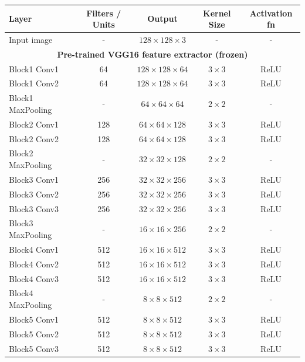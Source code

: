 \documentclass[11pt,a4paper]{article}
\begin{document}
\begin{table}[h!]
\centering
\renewcommand{\arraystretch}{1.15}
\begin{tabular}{||l|c|c|c|c||}
 \hline
 Layer & Filters / Units & Output & Kernel Size & Activation fn \\ [0.5ex]
 \hline\hline
 Input image        & -    & $128 \times 128 \times 3$   & -          & -      \\
 \hline\hline
 \multicolumn{5}{||c||}{\textbf{Pre-trained VGG16 feature extractor (frozen)}} \\
 \hline
 Block1 Conv1       & 64   & $128 \times 128 \times 64$  & $3 \times 3$ & ReLU  \\
 Block1 Conv2       & 64   & $128 \times 128 \times 64$  & $3 \times 3$ & ReLU  \\
 Block1 MaxPooling  & -    & $64 \times 64 \times 64$    & $2 \times 2$ & -     \\
 \hline
 Block2 Conv1       & 128  & $64 \times 64 \times 128$   & $3 \times 3$ & ReLU  \\
 Block2 Conv2       & 128  & $64 \times 64 \times 128$   & $3 \times 3$ & ReLU  \\
 Block2 MaxPooling  & -    & $32 \times 32 \times 128$   & $2 \times 2$ & -     \\
 \hline
 Block3 Conv1       & 256  & $32 \times 32 \times 256$   & $3 \times 3$ & ReLU  \\
 Block3 Conv2       & 256  & $32 \times 32 \times 256$   & $3 \times 3$ & ReLU  \\
 Block3 Conv3       & 256  & $32 \times 32 \times 256$   & $3 \times 3$ & ReLU  \\
 Block3 MaxPooling  & -    & $16 \times 16 \times 256$   & $2 \times 2$ & -     \\
 \hline
 Block4 Conv1       & 512  & $16 \times 16 \times 512$   & $3 \times 3$ & ReLU  \\
 Block4 Conv2       & 512  & $16 \times 16 \times 512$   & $3 \times 3$ & ReLU  \\
 Block4 Conv3       & 512  & $16 \times 16 \times 512$   & $3 \times 3$ & ReLU  \\
 Block4 MaxPooling  & -    & $8 \times 8 \times 512$     & $2 \times 2$ & -     \\
 \hline
 Block5 Conv1       & 512  & $8 \times 8 \times 512$     & $3 \times 3$ & ReLU  \\
 Block5 Conv2       & 512  & $8 \times 8 \times 512$     & $3 \times 3$ & ReLU  \\
 Block5 Conv3       & 512  & $8 \times 8 \times 512$     & $3 \times 3$ & ReLU  \\

\end{tabular}
\end{table}
\end{document}
